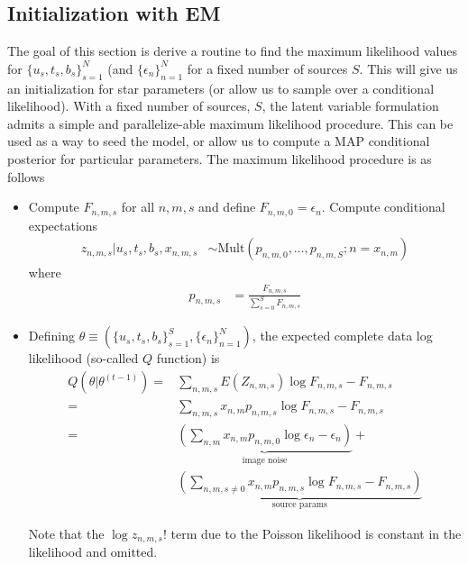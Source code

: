 \documentclass[11pt]{article}
\begin{document}
\subsection{Initialization with EM}
The goal of this section is derive a routine to find the maximum likelihood values for $\{ u_s, t_s, b_s \}_{s=1}^N$ (and $\{ \epsilon_n \}_{n=1}^N$ for a fixed number of sources $S$.  This will give us an initialization for star parameters (or allow us to sample over a conditional likelihood).  With a fixed number of sources, $S$, the latent variable formulation admits a simple and parallelize-able maximum likelihood procedure.  This can be used as a way to seed the model, or allow us to compute a MAP conditional posterior for particular parameters.  The maximum likelihood procedure is as follows
\begin{itemize}
\item Compute $F_{n,m,s}$ for all $n,m,s$ and define $F_{n,m,0} = \epsilon_n$.  Compute conditional expectations  
\begin{align}
  z_{n,m,s} | u_s, t_s, b_s, x_{n,m,s}
    &\sim \textrm{Mult}(p_{n,m,0}, \dots, p_{n,m,S}; n = x_{n,m})
  \label{eq:mult}
\end{align}
where 
\begin{align}
  p_{n,m,s} &= \frac{F_{n,m,s}}{\sum_{s=0}^S F_{n,m,s}}
\end{align}

\item Defining $\theta \equiv (\{u_s, t_s, b_s\}_{s=1}^S, \{ \epsilon_n \}_{n=1}^N) $, the expected complete data log likelihood (so-called $Q$ function) is
\begin{align}
  Q(\theta | \theta^{(t-1)})
    =& \sum_{n,m,s} E(Z_{n,m,s}) \log F_{n,m,s} - F_{n,m,s} \\
    =& \sum_{n,m,s} x_{n,m} p_{n,m,s} \log F_{n,m,s} - F_{n,m,s} \\
    =& \underbrace{\left( \sum_{n,m} x_{n,m} p_{n,m,0} \log \epsilon_n - \epsilon_n \right)}_{\text{image noise}} + \\
     & \underbrace{\left(\sum_{n,m,s\neq 0} x_{n,m} p_{n,m,s} \log F_{n,m,s} - F_{n,m,s}\right)}_{\text{source params}}
\end{align}

Note that the $\log z_{n,m,s}!$ term due to the Poisson likelihood is constant in the likelihood and omitted. 


\end{itemize}
\end{document}
